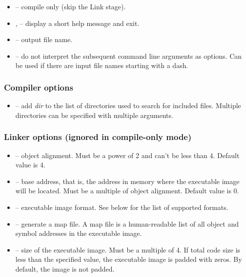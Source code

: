 \documentclass[a4paper,12pt,twoside,extrafontsizes]{memoir}
\begin{document}
\begin{itemize}
	\item {} -- compile only (skip the Link stage).
	
	\item {},  -- display a short help message and exit.
	
	\item {} -- output file name.
	
	\item \shellcmd{--} -- do not interpret the subsequent command line arguments as options. Can be used if there are input file names starting with a dash.
\end{itemize}

\subsubsection{Compiler options}

\begin{itemize}
	\item {} -- add \emph{dir} to the list of directories used to search for included files. Multiple directories can be specified with multiple  arguments.
\end{itemize}

\subsubsection{Linker options (ignored in compile-only mode)}

\begin{itemize}
	\item {} -- object alignment. Must be a power of 2 and can't be less than 4. Default value is 4.
	
	\item {} -- base address, that is, the address in memory where the executable image will be located. Must be a multiple of object alignment. Default value is 0.
	
	\item {} -- executable image format. See below for the list of supported formats.
	
	\item {} -- generate a map file. A map file is a human-readable list of all object and symbol addresses in the executable image.
	
	\item {} -- size of the executable image. Must be a multiple of 4. If total code size is less than the specified value, the executable image is padded with zeros. By default, the image is not padded.
\end{itemize}
\end{document}
